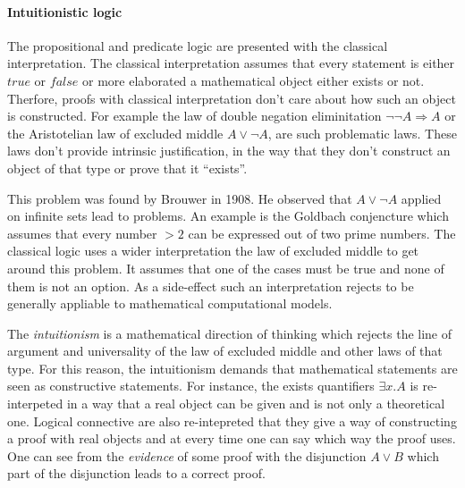 \paragraph{Intuitionistic logic}
The propositional and predicate logic are presented with the classical
interpretation. The classical interpretation assumes that every statement
is either $true$ or $false$ or more elaborated a mathematical object either
exists or not. Therfore, proofs with classical interpretation don't care
about how such an object is constructed. For example the law of double
negation eliminitation  $\neg\neg A\Rightarrow A$ or the Aristotelian law of excluded
middle $A \vee \neg A$, are such problematic laws. These laws don't provide
intrinsic justification, in the way that they don't construct an object
of that type or prove that it ``exists''.~\cite{sep-logic-intuitionistic, kreitz1994automatisierte}

This problem was found by Brouwer in 1908. He observed that $A \vee \neg A$
applied on infinite sets lead to problems. An example is the Goldbach
conjencture which assumes that every number $> 2$ can be expressed out of
two prime numbers. The classical logic uses a wider interpretation
the law of excluded middle to get around this problem. It assumes
that one of the cases must be true and none of them is not an option.
As a side-effect such an interpretation rejects to be generally
appliable to mathematical computational models.~\cite{sep-logic-intuitionistic, sep-mathematics-constructive}

The \textit{intuitionism} is a mathematical direction of thinking which
rejects the line of argument and universality of the law of excluded middle
and other laws of that type. For this reason, the intuitionism demands
that mathematical statements are seen as constructive statements.
For instance, the exists quantifiers $\exists x.A$ is re-interpeted in a way
that a real object can be given and is not only a theoretical one.
Logical connective are also re-intepreted that they give a way
of constructing a proof with real objects and at every time one can
say which way the proof uses. One can see from the \textit{evidence}
of some proof with the disjunction $A\vee B$ which part of the disjunction
leads to a correct proof.~\cite{kreitz1994automatisierte}


